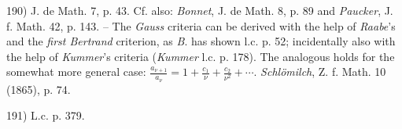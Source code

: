\vfill
\leftline{\rule{2in}{0.4pt}}
\vspace{0.2cm}
{
\footnotesize
190) J. de Math. 7, p. 43. Cf. also: \textit{Bonnet}, J. de Math. 8, p. 89 and \textit{Paucker}, J. f. Math. 42, p. 143. -- The \textit{Gauss} criteria can be derived with the help of \textit{Raabe}'s and the \textit{first Bertrand} criterion, as \textit{B}. has shown l.c. p. 52; incidentally also with the help of \textit{Kummer}'s criteria (\textit{Kummer} l.c. p. 178). The analogous holds for the somewhat more general case: $\frac{a_{\nu+1}}{a_\nu} = 1 + \frac{c_1}{\nu} + \frac{c_2}{\nu^2} + \cdots$. \textit{Schlömilch}, Z. f. Math. 10 (1865), p. 74.

191) L.c. p. 379.

}